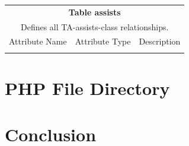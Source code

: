 \documentclass{paper}
\begin{document}
\begin{center}
		\begin{tabular}{c | c | l}
			\toprule
			\multicolumn{3}{c}{\textbf{Table assists}} \\
			\multicolumn{3}{c}{Defines all TA-assists-class relationships.}\\
			\midrule
			Attribute Name & Attribute Type & \multicolumn{1}{c}{Description} \\
			&  &  \\
			\bottomrule
		\end{tabular}

	\end{center}
	
	\section{PHP File Directory}
	
	\section{Conclusion}
	
	\clearpage
	
\end{document}
